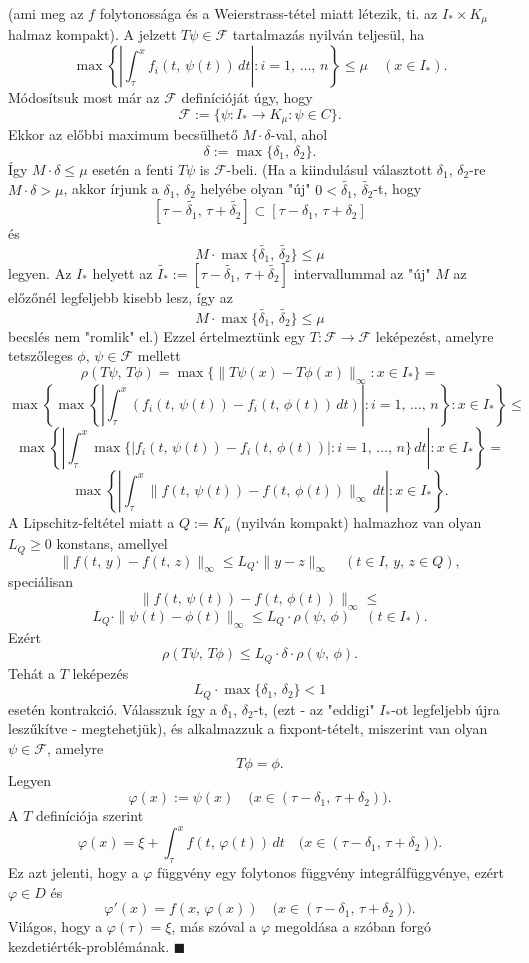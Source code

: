 (ami meg az $f$ folytonossága és a Weierstrass-tétel miatt létezik, ti. az $I_* \times K_\mu$ halmaz kompakt). A jelzett $T\psi \in \mathcal{F}$ tartalmazás nyilván teljesül, ha
\[
\max \left\{  \left| \int_\tau^x f_i(t, \, \psi(t)) \, dt \right| : i = 1, \, \dots, \, n \right\} \leq \mu \quad (x \in I_*).
\]
Módosítsuk most már az $\mathcal{F}$ definícióját úgy, hogy
\[
\mathcal{F} := \{ \psi : I_* \to K_\mu : \psi \in C \}.
\]
Ekkor az előbbi maximum becsülhető $M \cdot \delta$-val, ahol
\[
\delta := \max\{\delta_1, \, \delta_2\}.
\]
Így $M \cdot \delta \leq \mu$ esetén a fenti $T\psi$ is $\mathcal{F}$-beli. (Ha a kiindulásul választott $\delta_1, \, \delta_2$-re $M \cdot \delta > \mu$, akkor írjunk a $\delta_1, \, \delta_2$ helyébe olyan "új" $0 < \tilde{\delta_1}, \, \tilde{\delta_2}$-t, hogy
\[
[\tau - \tilde{\delta_1}, \, \tau + \tilde{\delta_2}] \subset [\tau - \delta_1, \, \tau + \delta_2]
\]
és
\[
M \cdot \max \{ \tilde{\delta_1}, \, \tilde{\delta_2} \} \leq \mu
\]
legyen. Az $I_*$ helyett az $\tilde{I_*} := [\tau - \tilde{\delta_1}, \, \tau + \tilde{\delta_2}]$ intervallummal az "új" $M$ az előzőnél legfeljebb kisebb lesz, így az
\[
M \cdot \max \{ \tilde{\delta_1}, \, \tilde{\delta_2}\} \leq \mu
\]
becslés nem "romlik" el.)
Ezzel értelmeztünk egy $T : \mathcal{F} \to \mathcal{F}$ leképezést, amelyre tetszőleges $\phi, \, \psi \in \mathcal{F}$ mellett
\[
\rho(T\psi, \, T\phi) = \max \{ \| T\psi(x) - T\phi(x)\|_\infty : x \in I_* \} =
\]
\[
\max \left\{  \max \left\{  \left| \int_\tau^x (f_i(t, \, \psi(t)) - f_i(t, \, \phi(t)) \, dt) \right| : i = 1, \, \dots, \, n \right\} : x \in I_* \right\} \leq
\]
\[
\max \left\{  \left| \int_\tau^x \max \{ |f_i(t, \, \psi(t)) - f_i(t, \, \phi(t))| : i = 1, \, \dots, \, n \} \, dt \right| : x \in I_* \right\} =
\]
\[
\max \left\{ \left| \int_\tau^x \| f(t, \, \psi(t)) - f(t, \, \phi(t))\|_\infty \, dt \right| : x \in I_* \right\}.
\]
A Lipschitz-feltétel miatt a $Q := K_\mu$ (nyilván kompakt) halmazhoz van olyan $L_Q \geq 0$ konstans, amellyel
\[
\| f(t, \, y) - f(t, \, z)\|_\infty \leq L_Q \cdot \| y-z \|_\infty \quad (t \in I, \, y, \, z \in Q),
\]
speciálisan
\[
\| f(t, \, \psi(t)) - f(t, \, \phi(t))\|_\infty \leq
\]
\[
L_Q \cdot \| \psi(t) - \phi(t) \|_\infty \leq L_Q \cdot \rho(\psi, \, \phi) \quad (t \in I_*).
\]
Ezért
\[
\rho(T\psi, \, T\phi) \leq L_Q \cdot \delta \cdot \rho(\psi, \, \phi).
\]
Tehát a $T$ leképezés
\[
L_Q \cdot \max \{\delta_1, \, \delta_2\} < 1
\]
esetén kontrakció. Válasszuk így a $\delta_1, \, \delta_2$-t, (ezt - az "eddigi" $I_*$-ot legfeljebb újra leszűkítve - megtehetjük), és alkalmazzuk a fixpont-tételt, miszerint van olyan $\psi \in \mathcal{F}$, amelyre
\[
T\phi = \phi.
\]
Legyen
\[
\varphi(x) := \psi(x) \quad \big( x \in (\tau - \delta_1, \, \tau + \delta_2) \big).
\]
A $T$ definíciója szerint
\[
\varphi(x) = \xi + \int_\tau^x f(t, \, \varphi(t)) \, dt \quad \big( x \in (\tau - \delta_1, \, \tau + \delta_2) \big).
\]
Ez azt jelenti, hogy a $\varphi$ függvény egy folytonos függvény integrálfüggvénye, ezért $\varphi \in D$ és
\[
\varphi'(x) = f(x, \, \varphi(x)) \quad \big( x \in (\tau - \delta_1, \, \tau + \delta_2) \big).
\]
Világos, hogy a $\varphi(\tau) = \xi$, más szóval a $\varphi$ megoldása a szóban forgó kezdetiérték-problémának. $\blacksquare$\\

